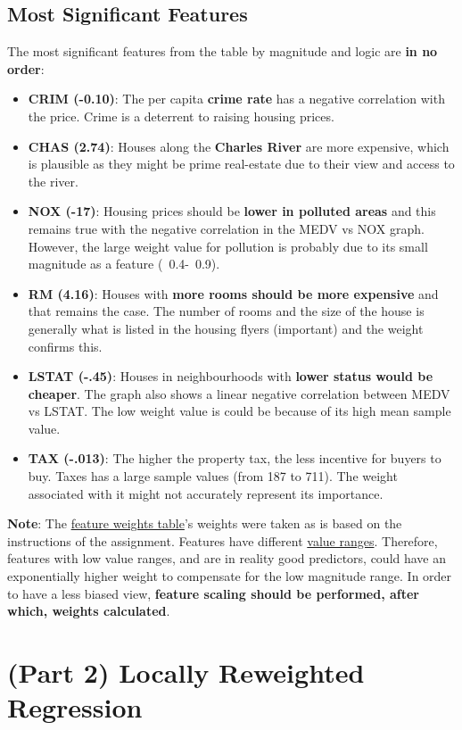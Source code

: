 \documentclass[10pt]{article}
\begin{document}
\subsection{Most Significant Features}

The most significant features from the table by magnitude and logic are \textbf{in no order}:
\begin{itemize}
\item \textbf{CRIM (-0.10)}: The per capita \textbf{crime rate} has a negative correlation with the price. Crime is a deterrent to raising housing prices.
\item \textbf{CHAS (2.74)}: Houses along the \textbf{Charles River} are more expensive, which is plausible as they might be prime real-estate due to their view and access to the river. 
\item \textbf{NOX (-17)}: Housing prices should be \textbf{lower in polluted areas} and this remains true with the negative correlation in the MEDV vs NOX graph. However, the large weight value for pollution is probably due to its small magnitude as a feature (~0.4-~0.9).
\item \textbf{RM (4.16)}: Houses with \textbf{more rooms should be more expensive }and that remains the case. The number of rooms and the size of the house is generally what is listed in the housing flyers (important) and the weight confirms this. 
\item \textbf{LSTAT (-.45)}: Houses in neighbourhoods with \textbf{lower status would be cheaper}. The graph also shows a linear negative correlation between MEDV vs LSTAT. The low weight value is could be because of its high mean sample value.
\item \textbf{TAX (-.013)}: The higher the property tax, the less incentive for buyers to buy. Taxes has a large sample values (from 187 to 711). The weight associated with it might not accurately represent its importance.
\end{itemize} 

\textbf{Note}: The \hyperref[sec:hfs]{feature weights table}'s weights were taken as is based on the instructions of the assignment. Features have different \hyperref[sec:rangez]{value ranges}. Therefore, features with low value ranges, and are in reality good predictors, could have an exponentially higher weight to compensate for the low magnitude range. In order to have a less biased view, \textbf{feature scaling should be performed, after which, weights calculated}.

\pagebreak
\section{(Part 2) Locally Reweighted Regression}
\end{document}
